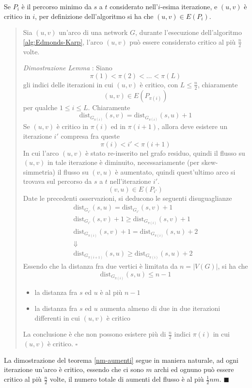 \documentclass[10pt, letterpaper]{report}
\begin{document}
Se $P_i$ è il percorso minimo da $s$ a $t$ considerato nell'$i$-esima iterazione, e $(u,v)$ è critico in $i$, per definizione dell'algoritmo si ha che $(u,v)\in E(P_i)$.\begin{quote}
    \begin{lemma2}
    Sia $(u,v)$ un'arco di una network $G$, durante l'esecuzione dell'algoritmo \ref{alg:Edmonds-Karp}, l'arco $(u,v)$ può essere considerato critico al più $\frac{n}{2}$ volte.
    \end{lemma2}
    \textit{Dimostrazione Lemma} : Siano 
    $$\pi(1)<\pi(2)<\dots < \pi(L) $$
    gli indici delle iterazioni in cui $(u,v)$ è critico, con $L\le \frac{n}{2}$, chiaramente $$(u,v)\in E(P_{\pi(i)}) $$
    per qualche $1\le i \le L$. Chiaramente
    $$\text{dist}_{G_{\pi(i)}}(s,v) = 
    \text{dist}_{G_{\pi(i)}}(s,u)+1 $$
    Se $(u,v)$ è critico in $\pi(i)$ ed in $\pi(i+1)$, allora deve esistere un iterazione $i'$ compresa fra queste 
    $$\pi(i)<i'<\pi(i+1) $$
    In cui l'arco $(u,v)$ è stato re-inserito nel grafo residuo, quindi il flusso su $(u,v)$ in tale iterazione è diminuito, necessariamente (per skew-simmetria) il flusso su $(v,u)$ è aumentato, quindi quest'ultimo arco si trovava sul percorso da $s$ a $t$ nell'iterazione $i'$.
    $$ (v,u)\in E(P_{i'})$$
    Date le precedenti osservazioni, si deducono le seguenti disuguaglianze 
    \begin{align}
        \text{dist}_{G_{i'}}(s,u)= \text{dist}_{G_{i'}}(s,v)+1\\
        \text{dist}_{G_{i'}}(s,v)+1\ge 
        \text{dist}_{G_{\pi(i)}}(s,v)+1 \\ 
        \text{dist}_{G_{\pi(i)}}(s,v)+1 =\text{dist}_{G_{\pi(i)}}(s,u)+2 \\ 
         \Downarrow   \\ 
          \text{dist}_{G_{\pi(i+1)}}(s,u)\ge
          \text{dist}_{G_{\pi(i)}}(s,u)+2
    \end{align}
    Essendo che la distanza fra due vertici è limitata da $n=|V(G)|$, si ha che 
    $$\text{dist}_{G_{\pi(i)}}(s,u)\le n-1 $$
\begin{itemize}
    \item la distanza fra $s$ ed $u$ è al più $n-1$ 
    \item la distanza fra $s$ ed $u$ aumenta almeno di due in due iterazioni differenti in cui $(u,v)$ è critico
\end{itemize}
La conclusione è che non possono esistere più di $\frac{n}{2}$ indici $\pi(i)$ in cui $(u,v)$ è critico. \hfill$\square$
\end{quote}
La dimostrazione del teorema \ref{nm-aumenti} segue in maniera naturale, ad ogni iterazione un'arco è critico, essendo che ci sono $m$ archi ed ognuno può essere critico al più $\frac{n}{2}$ volte, il numero  totale di aumenti del flusso è al più $\frac{1}{2}nm$. \hfill$\blacksquare$ 
\end{document}

